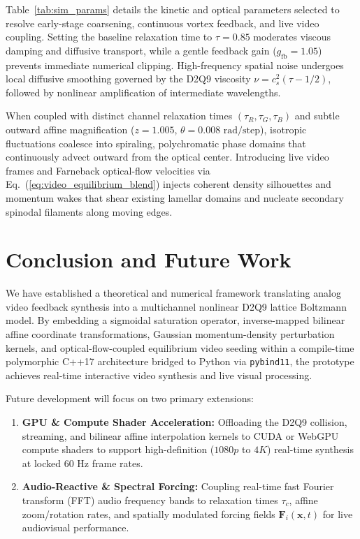 \documentclass[aps,pre,twocolumn,showpacs,superscriptaddress,floatfix]{revtex4-2}
\begin{document}
Table~\ref{tab:sim_params} details the kinetic and optical parameters selected to resolve early-stage coarsening, continuous vortex feedback, and live video coupling. Setting the baseline relaxation time to $\tau = 0.85$ moderates viscous damping and diffusive transport, while a gentle feedback gain ($g_{\mathrm{fb}} = 1.05$) prevents immediate numerical clipping. High-frequency spatial noise undergoes local diffusive smoothing governed by the D2Q9 viscosity $\nu = c_s^2 (\tau - 1/2)$, followed by nonlinear amplification of intermediate wavelengths.

When coupled with distinct channel relaxation times $(\tau_R, \tau_G, \tau_B)$ and subtle outward affine magnification ($z = 1.005$, $\theta = 0.008\text{ rad/step}$), isotropic fluctuations coalesce into spiraling, polychromatic phase domains that continuously advect outward from the optical center. Introducing live video frames and Farneback optical-flow velocities via Eq.~(\ref{eq:video_equilibrium_blend}) injects coherent density silhouettes and momentum wakes that shear existing lamellar domains and nucleate secondary spinodal filaments along moving edges.

\section{Conclusion and Future Work}

We have established a theoretical and numerical framework translating analog video feedback synthesis into a multichannel nonlinear D2Q9 lattice Boltzmann model. By embedding a sigmoidal saturation operator, inverse-mapped bilinear affine coordinate transformations, Gaussian momentum-density perturbation kernels, and optical-flow-coupled equilibrium video seeding within a compile-time polymorphic C++17 architecture bridged to Python via \texttt{pybind11}, the prototype achieves real-time interactive video synthesis and live visual processing.

Future development will focus on two primary extensions:
\begin{enumerate}
    \item \textbf{GPU \& Compute Shader Acceleration:} Offloading the D2Q9 collision, streaming, and bilinear affine interpolation kernels to CUDA or WebGPU compute shaders to support high-definition ($1080p$ to $4K$) real-time synthesis at locked $60\text{ Hz}$ frame rates.
    \item \textbf{Audio-Reactive \& Spectral Forcing:} Coupling real-time fast Fourier transform (FFT) audio frequency bands to relaxation times $\tau_c$, affine zoom/rotation rates, and spatially modulated forcing fields $\bm{F}_i(\bm{x}, t)$ for live audiovisual performance.
\end{enumerate}
\end{document}
